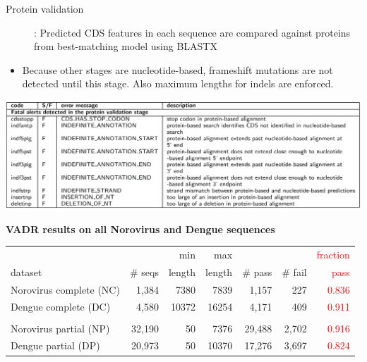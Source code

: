 \documentclass[landscape]{slides}
\begin{document}
\begin{slide}
\begin{center}

\begin{description}
\item[Protein validation]: Predicted CDS features in each sequence are
  compared against proteins from best-matching model using BLASTX
\end{description}

\begin{itemize} 
\item Because other stages are nucleotide-based, frameshift mutations
  are not detected until this stage. Also maximum lengths for indels
  are enforced. 
\end{itemize}

\includegraphics[width=10.5in]{figs/ss-protein-alert-list}

\end{center}
\vfill
\end{slide}
\begin{slide}
\begin{center}
\textbf{VADR results on all Norovirus and Dengue sequences}


\scriptsize
\begin{tabular}{l|r|r|r|r|r|r}
                        &         & min    & max      &         &         & \textcolor{red}{fraction} \\
 dataset                & \# seqs & length & length   & \# pass & \# fail & \textcolor{red}{pass} \\ \hline
Norovirus complete (NC) & 1,384    & 7380  & 7839     & 1,157    & 227     & \textcolor{red}{0.836} \\
Dengue complete (DC)    & 4,580    & 10372 & 16254    & 4,171    & 409     & \textcolor{red}{0.911} \\
& & & & & \\
Norovirus partial (NP)  & 32,190   & 50    & 7376     & 29,488   & 2,702    & \textcolor{red}{0.916} \\
Dengue partial  (DP)    & 20,973   & 50    & 10370    & 17,276   & 3,697    & \textcolor{red}{0.824} \\
\end{tabular}

\end{center}
\vfill
\end{slide}
\end{document}
